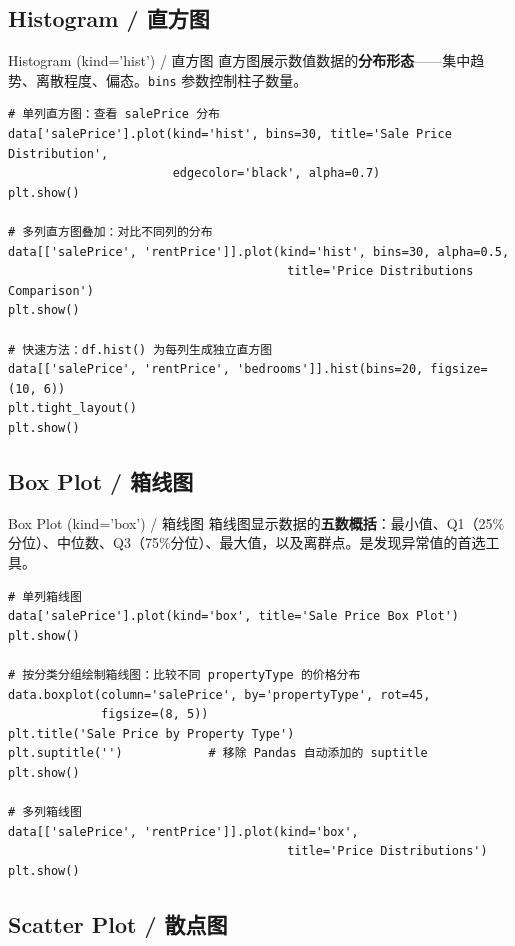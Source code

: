 \documentclass[11pt,a4paper]{report}
\let\oldtexttt\texttt
\renewcommand{\texttt}[1]{\textcolor{mainblue}{\oldtexttt{#1}}}
\begin{document}
\subsection{Histogram / 直方图}

\begin{examplebox}{Histogram (kind='hist') / 直方图}
    直方图展示数值数据的\textbf{分布形态}——集中趋势、离散程度、偏态。\texttt{bins} 参数控制柱子数量。
\begin{lstlisting}
# 单列直方图：查看 salePrice 分布
data['salePrice'].plot(kind='hist', bins=30, title='Sale Price Distribution',
                       edgecolor='black', alpha=0.7)
plt.show()

# 多列直方图叠加：对比不同列的分布
data[['salePrice', 'rentPrice']].plot(kind='hist', bins=30, alpha=0.5,
                                       title='Price Distributions Comparison')
plt.show()

# 快速方法：df.hist() 为每列生成独立直方图
data[['salePrice', 'rentPrice', 'bedrooms']].hist(bins=20, figsize=(10, 6))
plt.tight_layout()
plt.show()
\end{lstlisting}
\end{examplebox}

\subsection{Box Plot / 箱线图}

\begin{examplebox}{Box Plot (kind='box') / 箱线图}
    箱线图显示数据的\textbf{五数概括}：最小值、Q1（25\%分位）、中位数、Q3（75\%分位）、最大值，以及离群点。是发现异常值的首选工具。
\begin{lstlisting}
# 单列箱线图
data['salePrice'].plot(kind='box', title='Sale Price Box Plot')
plt.show()

# 按分类分组绘制箱线图：比较不同 propertyType 的价格分布
data.boxplot(column='salePrice', by='propertyType', rot=45,
             figsize=(8, 5))
plt.title('Sale Price by Property Type')
plt.suptitle('')            # 移除 Pandas 自动添加的 suptitle
plt.show()

# 多列箱线图
data[['salePrice', 'rentPrice']].plot(kind='box',
                                       title='Price Distributions')
plt.show()
\end{lstlisting}
\end{examplebox}

\subsection{Scatter Plot / 散点图}
\end{document}

